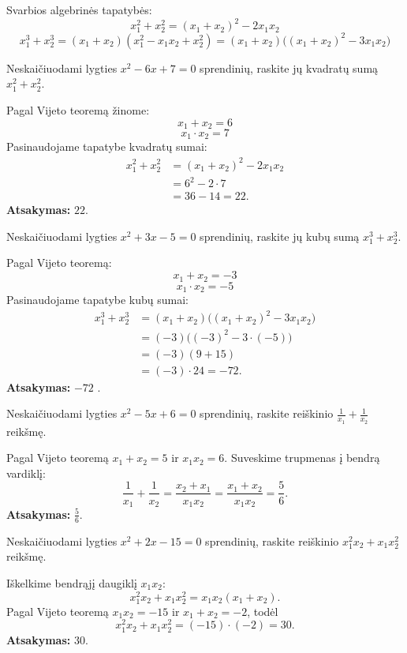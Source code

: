 \documentclass[11pt,a4paper]{scrartcl}
\begin{document}
\begin{remark}
Svarbios algebrinės tapatybės:
\[ x_1^2 + x_2^2 = (x_1 + x_2)^2 - 2x_1x_2 \]
\[ x_1^3 + x_2^3 = (x_1 + x_2)(x_1^2 - x_1x_2 + x_2^2) = (x_1 + x_2)\big((x_1 + x_2)^2 - 3x_1x_2\big) \]
\end{remark}

\begin{example}
Neskaičiuodami lygties $x^2 - 6x + 7 = 0$ sprendinių, raskite jų kvadratų sumą $x_1^2 + x_2^2$.
\end{example}
\begin{solution}
Pagal Vijeto teoremą žinome:
\[ x_1 + x_2 = 6 \]
\[ x_1 \cdot x_2 = 7 \]
Pasinaudojame tapatybe kvadratų sumai:
\[
\begin{aligned}
x_1^2 + x_2^2 &= (x_1 + x_2)^2 - 2x_1x_2 \\
&= 6^2 - 2 \cdot 7 \\
&= 36 - 14 = 22.
\end{aligned}
\]
\textbf{Atsakymas:} $22.$ 
\end{solution}

\begin{example}
Neskaičiuodami lygties $x^2 + 3x - 5 = 0$ sprendinių, raskite jų kubų sumą $x_1^3 + x_2^3$.
\end{example}
\begin{solution}
Pagal Vijeto teoremą:
\[ x_1 + x_2 = -3 \]
\[ x_1 \cdot x_2 = -5 \]
Pasinaudojame tapatybe kubų sumai:
\[
\begin{aligned}
x_1^3 + x_2^3 &= (x_1 + x_2)\big((x_1 + x_2)^2 - 3x_1x_2\big) \\
&= (-3)\big((-3)^2 - 3 \cdot (-5)\big) \\
&= (-3)(9 + 15) \\
&= (-3) \cdot 24 = -72.
\end{aligned}
\]
\textbf{Atsakymas:} $-72$ .
\end{solution}

\begin{example}
Neskaičiuodami lygties $x^2-5x+6=0$ sprendinių, raskite reiškinio $\frac{1}{x_1}+\frac{1}{x_2}$ reikšmę.
\end{example}
\begin{solution}
Pagal Vijeto teoremą $x_1+x_2=5$ ir $x_1x_2=6$. Suveskime trupmenas į bendrą vardiklį:
\[
\frac{1}{x_1}+\frac{1}{x_2}
=\frac{x_2+x_1}{x_1x_2}
=\frac{x_1+x_2}{x_1x_2}
=\frac{5}{6}.
\]
\textbf{Atsakymas:} $\frac{5}{6}$.
\end{solution}

\begin{example}
Neskaičiuodami lygties $x^2+2x-15=0$ sprendinių, raskite reiškinio $x_1^2x_2+x_1x_2^2$ reikšmę.
\end{example}
\begin{solution}
Iškelkime bendrąjį daugiklį $x_1x_2$:
\[
x_1^2x_2+x_1x_2^2=x_1x_2(x_1+x_2).
\]
Pagal Vijeto teoremą $x_1x_2=-15$ ir $x_1+x_2=-2$, todėl
\[
x_1^2x_2+x_1x_2^2=(-15)\cdot(-2)=30.
\]
\textbf{Atsakymas:} $30$.
\end{solution}
\end{document}
